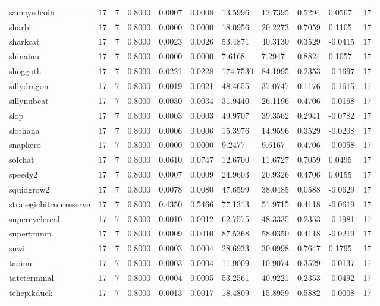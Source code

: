 \begin{table}[htbp]
\begin{tabular}{lllllllllll}
samoyedcoin & 17 & 7 & 0.8000 & 0.0007 & 0.0008 & 13.5996 & 12.7395 & 0.5294 & 0.0567 & 17 \\
sharbi & 17 & 7 & 0.8000 & 0.0000 & 0.0000 & 18.0956 & 20.2273 & 0.7059 & 0.1105 & 17 \\
sharkcat & 17 & 7 & 0.8000 & 0.0023 & 0.0026 & 53.4871 & 40.3130 & 0.3529 & -0.0415 & 17 \\
shinainu & 17 & 7 & 0.8000 & 0.0000 & 0.0000 & 7.6168 & 7.2947 & 0.8824 & 0.1057 & 17 \\
shoggoth & 17 & 7 & 0.8000 & 0.0221 & 0.0228 & 174.7530 & 84.1995 & 0.2353 & -0.1697 & 17 \\
sillydragon & 17 & 7 & 0.8000 & 0.0019 & 0.0021 & 48.4655 & 37.0747 & 0.1176 & -0.1615 & 17 \\
sillynubcat & 17 & 7 & 0.8000 & 0.0030 & 0.0034 & 31.9440 & 26.1196 & 0.4706 & -0.0168 & 17 \\
slop & 17 & 7 & 0.8000 & 0.0003 & 0.0003 & 49.9707 & 39.3562 & 0.2941 & -0.0782 & 17 \\
slothana & 17 & 7 & 0.8000 & 0.0006 & 0.0006 & 15.3976 & 14.9596 & 0.3529 & -0.0208 & 17 \\
snapkero & 17 & 7 & 0.8000 & 0.0000 & 0.0000 & 9.2477 & 9.6167 & 0.4706 & -0.0058 & 17 \\
solchat & 17 & 7 & 0.8000 & 0.0610 & 0.0747 & 12.6700 & 11.6727 & 0.7059 & 0.0495 & 17 \\
speedy2 & 17 & 7 & 0.8000 & 0.0007 & 0.0009 & 24.9603 & 20.9326 & 0.4706 & 0.0155 & 17 \\
squidgrow2 & 17 & 7 & 0.8000 & 0.0078 & 0.0080 & 47.6599 & 38.0485 & 0.0588 & -0.0629 & 17 \\
strategicbitcoinreserve & 17 & 7 & 0.8000 & 0.4350 & 0.5466 & 77.1313 & 51.9715 & 0.4118 & -0.0619 & 17 \\
supercyclereal & 17 & 7 & 0.8000 & 0.0010 & 0.0012 & 62.7575 & 48.3335 & 0.2353 & -0.1981 & 17 \\
supertrump & 17 & 7 & 0.8000 & 0.0009 & 0.0010 & 87.5368 & 58.0350 & 0.4118 & -0.0219 & 17 \\
suwi & 17 & 7 & 0.8000 & 0.0003 & 0.0004 & 28.6933 & 30.0998 & 0.7647 & 0.1795 & 17 \\
taoinu & 17 & 7 & 0.8000 & 0.0003 & 0.0004 & 11.9009 & 10.9074 & 0.3529 & -0.0137 & 17 \\
tateterminal & 17 & 7 & 0.8000 & 0.0004 & 0.0005 & 53.2561 & 40.9221 & 0.2353 & -0.0492 & 17 \\
tehepikduck & 17 & 7 & 0.8000 & 0.0013 & 0.0017 & 18.4809 & 15.8959 & 0.5882 & -0.0008 & 17 \\

\end{tabular}
\end{table}
